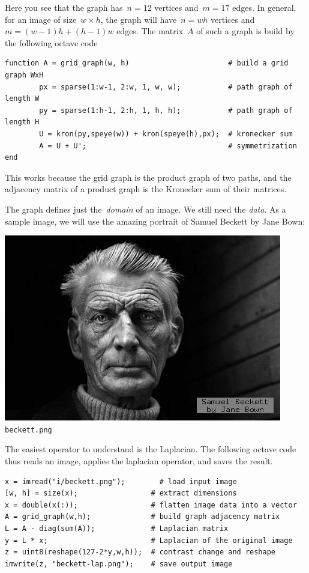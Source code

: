 Here you see that the graph has~$n=12$ vertices and~$m=17$ edges.
In general, for an image of size~$w\times h$, the graph will have~$n=wh$
vertices and~$m=(w-1)h+(h-1)w$ edges.  The matrix~$A$ of such a graph is
build by the following octave code

\begin{verbatim}
function A = grid_graph(w, h)                       # build a grid graph WxH
        px = sparse(1:w-1, 2:w, 1, w, w);           # path graph of length W
        py = sparse(1:h-1, 2:h, 1, h, h);           # path graph of length H
        U = kron(py,speye(w)) + kron(speye(h),px);  # kronecker sum
        A = U + U';                                 # symmetrization
end
\end{verbatim}

This works because the grid graph is the product graph of two paths, and the
adjacency matrix of a product graph is the Kronecker sum of their matrices.

The graph defines just the~\emph{domain} of an image.  We still need the
\emph{data}.  As a sample image, we will use the amazing portrait of Samuel
Beckett by Jane Bown:

\includegraphics{i/beckett.png}
{\small\verb+beckett.png+}

The easiest operator to understand is the Laplacian.  The following octave
code thus reads an image, applies the laplacian operator, and saves the
result.

\begin{verbatim}
x = imread("i/beckett.png");        # load input image
[w, h] = size(x);                 # extract dimensions
x = double(x(:));                 # flatten image data into a vector
A = grid_graph(w,h);              # build graph adjacency matrix
L = A - diag(sum(A));             # Laplacian matrix
y = L * x;                        # Laplacian of the original image
z = uint8(reshape(127-2*y,w,h));  # contrast change and reshape
imwrite(z, "beckett-lap.png");    # save output image
\end{verbatim}


